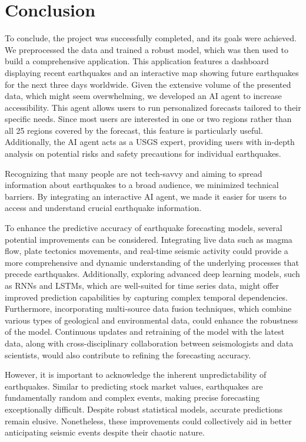 \chapter{Conclusion}\label{ch:conclusion}
To conclude, the project was successfully completed, and its goals were achieved.
We preprocessed the data and trained a robust model, which was then used to build a
comprehensive application. This application features a dashboard displaying recent
earthquakes and an interactive map showing future earthquakes for the next three days
worldwide. Given the extensive volume of the presented data, which might seem overwhelming,
we developed an AI agent to increase accessibility. This agent allows users to run
personalized forecasts tailored to their specific needs. Since most users are
interested in one or two regions rather than all 25 regions covered by the forecast,
this feature is particularly useful. Additionally, the AI agent acts as a \ac{USGS} expert,
providing users with in-depth analysis on potential risks and safety precautions for individual earthquakes.

Recognizing that many people are not tech-savvy and aiming to spread information
about earthquakes to a broad audience, we minimized technical barriers. By integrating
an interactive AI agent, we made it easier for users to access and understand crucial
earthquake information.

To enhance the predictive accuracy of earthquake forecasting models, several potential
improvements can be considered. Integrating live data such as magma flow, plate tectonics
movements, and real-time seismic activity could provide a more comprehensive and dynamic
understanding of the underlying processes that precede earthquakes. Additionally, exploring
advanced deep learning models, such as \ac{RNNs} and \ac{LSTM}s, which are well-suited for time series
data, might offer improved prediction capabilities by capturing complex temporal dependencies.
Furthermore, incorporating multi-source data fusion techniques, which combine various types of
geological and environmental data, could enhance the robustness of the model. Continuous
updates and retraining of the model with the latest data, along with cross-disciplinary
collaboration between seismologists and data scientists, would also contribute to refining
the forecasting accuracy.

However, it is important to acknowledge the inherent unpredictability of earthquakes.
Similar to predicting stock market values, earthquakes are fundamentally random and
complex events, making precise forecasting exceptionally difficult. Despite robust
statistical models, accurate predictions remain elusive. Nonetheless, these improvements
could collectively aid in better anticipating seismic events despite their chaotic nature.